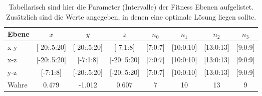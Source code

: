 %
\begin{table} [h!]
	\begin{center}
		\begin{tabular}{lccccccc}
		\textbf{Ebene} & \textbf{$x$} & \textbf{$y$} & \textbf{$z$} & \textbf{$n_0$} & \textbf{$n_1$}& \textbf{$n_2$} & \textbf{$n_3$} \\
			\hline
			x-y & [-20:.5:20]		& [-20:.5:20]	& [-7:1:8] & [7:0:7] & [10:0:10]& [13:0:13]&[9:0:9]   \\
			x-z & [-20:.5:20] 	& [-7:1:8] 	& [-20:.5:20] & [7:0:7] & [10:0:10]& [13:0:13]&[9:0:9] \\
			y-z & [-7:1:8]  	& [-20:.5:20]	& [-20:.5:20] & [7:0:7] & [10:0:10]& [13:0:13]&[9:0:9]\\
			\hline
			Wahre & 0.479 & -1.012 & 0.607 & 7  & 10 & 13 & 9			\\
%
		\end{tabular}
		\caption[Parameter der Fitness Ebenen]{Tabellarisch sind hier die Parameter (Intervalle) der Fitness Ebenen aufgelistet. Zusätzlich sind die Werte angegeben, in denen eine optimale Lösung liegen sollte. }
		\label{tab:complexity1}
	\end{center}
\end{table}